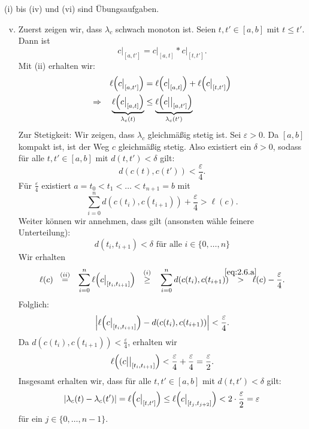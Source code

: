 \begin{beweis}
	(i) bis (iv) und (vi) sind Übungsaufgaben.
	\begin{enumerate}[(i)]
		\setcounter{enumi}{4}
		\item Zuerst zeigen wir, dass $\lambda_c$ schwach monoton ist.
		Seien $t, t' \in [a,b]$ mit $t \leq t'$.
		Dann ist
		\[
			c \big|_{[a,t']} = c \big|_{[a,t]} * c\big|_{[t,t']}.
		\]
		Mit (ii) erhalten wir:
		\begin{align*}
			\ell\enbrace*{c \big|_{[a,t']}} &= \ell \enbrace*{c \big|_{[a,t]}} + \ell \enbrace*{c\big|_{[t,t']}} \\
			\Rightarrow \quad \Underbrace{\ell\enbrace*{c \big|_{[a,t]}}}{\lambda_c(t)} &\leq \Underbrace{\ell\enbrace*{c \big|\big|_{[a,t']}}}{\lambda_c(t')}
		\end{align*}
		Zur Stetigkeit:
		Wir zeigen, dass $\lambda_c$ gleichmäßig stetig ist.
		Sei $\varepsilon > 0$.
		Da $[a,b]$ kompakt ist, ist der Weg $c$ gleichmäßig stetig.
		Also existiert ein $\delta > 0$, sodass für alle $t, t' \in [a,b]$ mit $d(t,t') < \delta$ gilt:
		\[
			d(c(t),c(t')) < \frac{\varepsilon}{4}.
		\]
		Für $\frac{\varepsilon}{4}$ existiert $a = t_0 < t_1 < \dots < t_{n+1} = b$ mit
		\begin{equation}
			\sum\limits_{i=0}^{n} d(c(t_i),c(t_{i+1})) + \frac{\varepsilon}{4} > \ell(c). \label{eq:2.6.a}
		\end{equation}
		Weiter können wir annehmen, dass gilt (ansonsten wähle feinere Unterteilung):
		\begin{equation}
			d(t_i,t_{i+1}) < \delta \text{ für alle } i \in \{0,\dots,n\} \label{eq:2.6.b}
		\end{equation}
		Wir erhalten
		\begin{equation}
			\ell(c) \stack{(ii)}{=} \sum\limits_{i=0}^{n} \ell\enbrace*{ c\big|_{[t_i,t_{i+1}]}} \stack{(i)}{\geq} \sum\limits_{i=0}^n d(c(t_i),c(t_{i+1})) \stack{\eqref{eq:2.6.a}}{>} \ell(c) - \frac{\varepsilon}{4}.
		\end{equation}
		Folglich:
		\[
			\abs*{\ell\enbrace*{c\big|_{[t_i,t_{i+1}]}} - d(c(t_i),c(t_{i+1}))} < \frac{\varepsilon}{4}.
		\]
		Da $d(c(t_i),c(t_{i+1})) < \frac{\varepsilon}{4}$, erhalten wir
		\[
			\ell\enbrace*{(c \big|\big|_{[t_i,t_{i+1}]}} < \frac{\varepsilon}{4} + \frac{\varepsilon}{4} = \frac{\varepsilon}{2}.
		\]
		Insgesamt erhalten wir, dass für alle $t,t' \in [a,b]$ mit $d(t,t') < \delta$ gilt:
		\[
			\abs{\lambda_c(t)-\lambda_c(t')} = \ell\enbrace*{c \big|_{[t,t']}} \leq \ell\enbrace*{c\big|_{[t_j,t_{j+2}]}} < 2 \cdot \frac{\varepsilon}{2} = \varepsilon
		\]
		für ein $j \in \{0, \dots, n-1\}$.
		

\end{enumerate}
\end{beweis}
